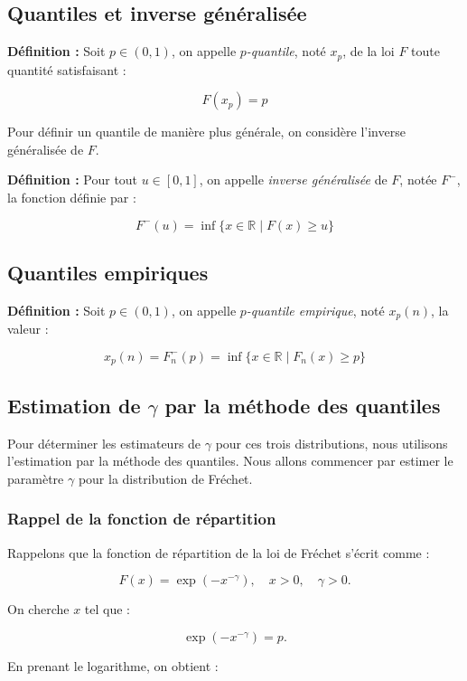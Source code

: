\documentclass{article}
\begin{document}
\subsection{Quantiles et inverse généralisée}

\textbf{Définition :} Soit \(p \in (0,1)\), on appelle \textit{\(p\)-quantile}, noté \(x_p\), de la loi \(F\) toute quantité satisfaisant :

\[
F(x_p) = p
\]

Pour définir un quantile de manière plus générale, on considère l'inverse généralisée de \(F\).

\textbf{Définition :} Pour tout \(u \in [0,1]\), on appelle \textit{inverse généralisée} de \(F\), notée \(F^-\), la fonction définie par :

\[
F^-(u) = \inf \{ x \in \mathbb{R} \mid F(x) \geq u \}
\]

\subsection{Quantiles empiriques}

\textbf{Définition :} Soit \(p \in (0,1)\), on appelle \textit{\(p\)-quantile empirique}, noté \(x_p(n)\), la valeur :

\[
x_p(n) = F_n^-(p) = \inf \{ x \in \mathbb{R} \mid F_n(x) \geq p \}
\]

\subsection{Estimation de \(\gamma\) par la méthode des quantiles}

Pour déterminer les estimateurs de \(\gamma\) pour ces trois distributions, nous utilisons l'estimation par la méthode des quantiles.  
Nous allons commencer par estimer le paramètre \(\gamma\) pour la distribution de Fréchet.

\subsubsection{Rappel de la fonction de répartition}

Rappelons que la fonction de répartition de la loi de Fréchet s'écrit comme :

\[
F(x) = \exp(-x^{-\gamma}), \quad x > 0, \quad \gamma > 0.
\]

On cherche \(x\) tel que :

\[
\exp(-x^{-\gamma}) = p.
\]

En prenant le logarithme, on obtient :
\end{document}
